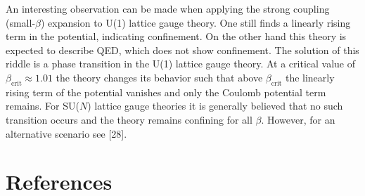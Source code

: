 An interesting observation can be made when applying the strong coupling
(small-$\beta$) expansion to U(1) lattice gauge theory. One still finds a
linearly rising term in the potential, indicating confinement. On the other hand
this theory is expected to describe QED, which does not show confinement. The
solution of this riddle is a phase transition in the U(1) lattice gauge theory.
At a critical value of $\beta_{\mathrm{crit}} \approx 1.01$ the theory changes
its behavior such that above $\beta_{\mathrm{crit}}$ the linearly rising term
of the potential vanishes and only the Coulomb potential term remains. For
SU($N$) lattice gauge theories it is generally believed that no such transition
occurs and the theory remains confining for all $\beta$. However, for an
alternative scenario see [28].

\section*{References}


